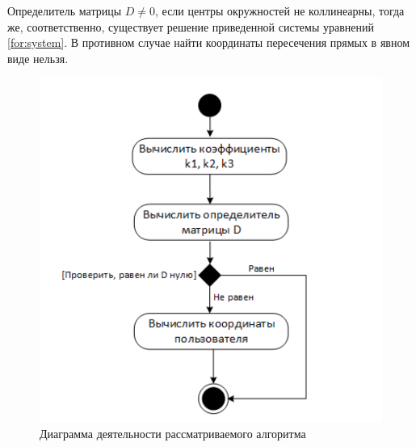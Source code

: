 Определитель матрицы $D \neq 0$, если центры окружностей не коллинеарны, тогда же, соответственно, существует решение приведенной системы уравнений \ref{for:system}. В противном случае найти координаты пересечения прямых в явном виде нельзя.

\begin{figure}[ht]
    \centering
    \includegraphics[scale=0.7]{img/powerCenterActivity}
    \caption{Диаграмма деятельности рассматриваемого алгоритма}
\end{figure}